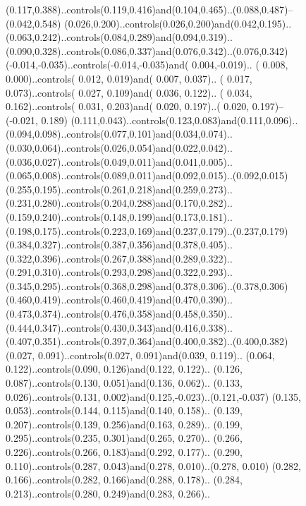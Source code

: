 \begin{figure}[H]
{\begin{scope}[#2,rotate=#1]
            (0.117,0.388)..controls(0.119,0.416)and(0.104,0.465)..(0.088,0.487)--(0.042,0.548)
            (0.026,0.200)..controls(0.026,0.200)and(0.042,0.195)..
            (0.063,0.242)..controls(0.084,0.289)and(0.094,0.319)..
            (0.090,0.328)..controls(0.086,0.337)and(0.076,0.342)..(0.076,0.342)
            (-0.014,-0.035)..controls(-0.014,-0.035)and( 0.004,-0.019)..
            ( 0.008, 0.000)..controls( 0.012, 0.019)and( 0.007, 0.037)..
            ( 0.017, 0.073)..controls( 0.027, 0.109)and( 0.036, 0.122)..
            ( 0.034, 0.162)..controls( 0.031, 0.203)and( 0.020, 0.197)..( 0.020, 0.197)--(-0.021, 0.189)
            (0.111,0.043)..controls(0.123,0.083)and(0.111,0.096)..
            (0.094,0.098)..controls(0.077,0.101)and(0.034,0.074)..
            (0.030,0.064)..controls(0.026,0.054)and(0.022,0.042)..
            (0.036,0.027)..controls(0.049,0.011)and(0.041,0.005)..
            (0.065,0.008)..controls(0.089,0.011)and(0.092,0.015)..(0.092,0.015)
            (0.255,0.195)..controls(0.261,0.218)and(0.259,0.273)..
            (0.231,0.280)..controls(0.204,0.288)and(0.170,0.282)..
            (0.159,0.240)..controls(0.148,0.199)and(0.173,0.181)..
            (0.198,0.175)..controls(0.223,0.169)and(0.237,0.179)..(0.237,0.179)
            (0.384,0.327)..controls(0.387,0.356)and(0.378,0.405)..
            (0.322,0.396)..controls(0.267,0.388)and(0.289,0.322)..
            (0.291,0.310)..controls(0.293,0.298)and(0.322,0.293)..
            (0.345,0.295)..controls(0.368,0.298)and(0.378,0.306)..(0.378,0.306)
            (0.460,0.419)..controls(0.460,0.419)and(0.470,0.390)..
            (0.473,0.374)..controls(0.476,0.358)and(0.458,0.350)..
            (0.444,0.347)..controls(0.430,0.343)and(0.416,0.338)..
            (0.407,0.351)..controls(0.397,0.364)and(0.400,0.382)..(0.400,0.382)
            (0.027, 0.091)..controls(0.027, 0.091)and(0.039, 0.119)..
            (0.064, 0.122)..controls(0.090, 0.126)and(0.122, 0.122)..
            (0.126, 0.087)..controls(0.130, 0.051)and(0.136, 0.062)..
            (0.133, 0.026)..controls(0.131, 0.002)and(0.125,-0.023)..(0.121,-0.037)
            (0.135, 0.053)..controls(0.144, 0.115)and(0.140, 0.158)..
            (0.139, 0.207)..controls(0.139, 0.256)and(0.163, 0.289)..
            (0.199, 0.295)..controls(0.235, 0.301)and(0.265, 0.270)..
            (0.266, 0.226)..controls(0.266, 0.183)and(0.292, 0.177)..
            (0.290, 0.110)..controls(0.287, 0.043)and(0.278, 0.010)..(0.278, 0.010)
            (0.282, 0.166)..controls(0.282, 0.166)and(0.288, 0.178)..
            (0.284, 0.213)..controls(0.280, 0.249)and(0.283, 0.266)..

\end{scope}}
\end{figure}
